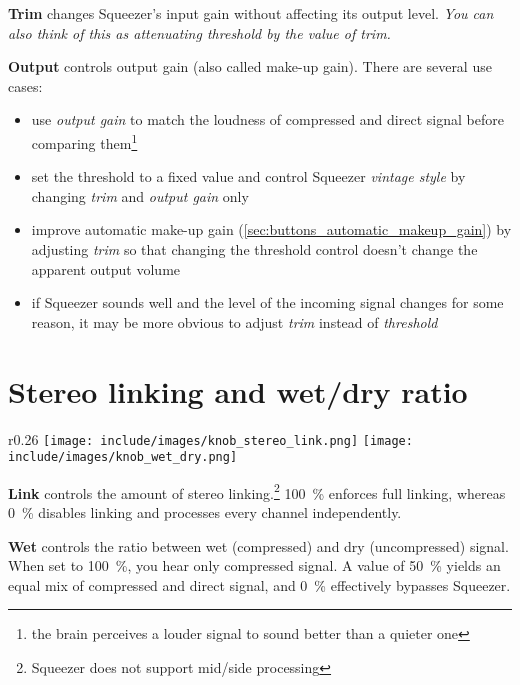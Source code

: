 \textbf{Trim} changes Squeezer's input gain without affecting its
output level.  \emph{You can also think of this as attenuating
  threshold by the value of trim.}

\textbf{Output} controls output gain (also called make-up gain).
There are several use cases:

\begin{itemize}
\item use \emph{output gain} to match the loudness of compressed and
  direct signal before comparing them\footnote{the brain perceives a
    louder signal to sound better than a quieter one}

\item set the threshold to a fixed value and control Squeezer
  \emph{vintage style} by changing \emph{trim} and \emph{output gain}
  only

\item improve automatic make-up gain
  (\ref{sec:buttons_automatic_makeup_gain}) by adjusting \emph{trim}
  so that changing the threshold control doesn't change the apparent
  output volume

\item if Squeezer sounds well and the level of the incoming signal
  changes for some reason, it may be more obvious to adjust
  \emph{trim} instead of \emph{threshold}
\end{itemize}

\section{Stereo linking and wet/dry ratio}

\begin{wrapfigure}{r}{0.26\linewidth}
  \texttt{[image: include/images/knob\_stereo\_link.png]}
  \texttt{[image: include/images/knob\_wet\_dry.png]}
\end{wrapfigure}

\textbf{Link} controls the amount of stereo linking.\footnote{Squeezer
  does not support mid/side processing} \SI{100}{\percent} enforces
full linking, whereas \SI{0}{\percent} disables linking and processes
every channel independently.

\textbf{Wet} controls the ratio between wet (compressed) and dry
(uncompressed) signal.  When set to \SI{100}{\percent}, you hear only
compressed signal.  A value of \SI{50}{\percent} yields an equal mix
of compressed and direct signal, and \SI{0}{\percent} effectively
bypasses Squeezer.

